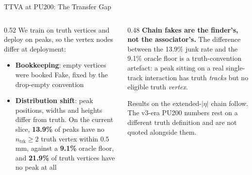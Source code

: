 \documentclass[xcolor=table,aspectratio=169]{beamer}
\newcommand{\ntrk}{\ensuremath{n_\mathrm{trk}}}
\begin{document}
\begin{frame}{TTVA at PU200: The Transfer Gap}
    \small
    \begin{columns}[t]
        \begin{column}{0.52\linewidth}
            We train on truth vertices and deploy on peaks, so the vertex nodes differ
            at deployment:
            \begin{itemize}
                \setlength\itemsep{0.35em}
                \item \textbf{Bookkeeping}: empty vertices were booked Fake, fixed by
                    the drop-empty convention
                \item \textbf{Distribution shift}: peak positions, widths and heights
                    differ from truth. On the current slice, \textbf{13.9\%} of peaks
                    have no $\ntrk\geq2$ truth vertex within $0.5$\,mm, against a
                    \textbf{9.1\%} oracle floor, and \textbf{21.9\%} of truth vertices
                    have no peak at all
            \end{itemize}
        \end{column}
        \begin{column}{0.48\linewidth}
            \textbf{Chain fakes are the finder's, not the associator's.} The
            difference between the 13.9\% junk rate and the 9.1\% oracle floor is a
            truth-convention artefact: a peak sitting on a real single-track
            interaction has truth \emph{tracks} but no eligible truth \emph{vertex}.
            \vspace{0.5em}

            {\footnotesize\textcolor{black!55}{Results on the extended-$|\eta|$ chain
            follow. The v3-era PU200 numbers rest on a different truth definition and
            are not quoted alongside them.}}
        \end{column}
    \end{columns}
\end{frame}
\end{document}
